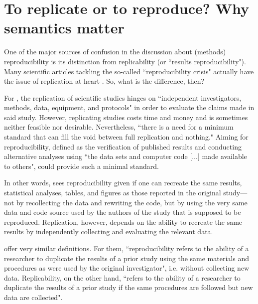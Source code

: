 \documentclass[11pt, a4paper,twoside]{report}\usepackage[]{graphicx}\usepackage[]{color}
\begin{document}
\section[To replicate or to reproduce?]{To replicate or to reproduce? Why semantics matter}
\label{sec:replicate}
One of the major sources of confusion in the discussion about (methods) reproducibility is its distinction from replicability (or ``results reproducibility"). Many scientific articles tackling the so-called ``reproducibility crisis" \citep{casadevall_reproducible_2010,prinz_believe_2011,begley2012drug,begley_six_2013,begley2015reproducibility,freedman_economics_2015,aarts2015estimating,baker2016there,baker2016reproducibility,crotty_reproducible_2017,nosek_reproducibility_2017} actually have the issue of replication at heart \citep{schooler2014metascience,stroebe_alleged_2014,kullmann2015biomedicine,maxwell_is_2015,earp_replication_2015,camerer_evaluating_2016,loken_measurement_2017}. So, what is the difference, then?

For \cite{peng_reproducible_2009}, the replication of scientific studies hinges on ``independent investigators, methods, data, equipment, and protocols" in order to evaluate the claims made in said study. However, replicating studies costs time and money and is sometimes neither feasible nor desirable. Nevertheless, ``there is a need for a minimum standard that can fill the void between full replication and nothing." Aiming for reproducibility, defined as the verification of published results and conducting alternative analyses using ``the data sets and computer code [$\dots$] made available to others", could provide such a minimal standard. 

In other words, \cite{peng_reproducible_2009} sees reproducibility given if one can recreate the same results, statistical analyses, tables, and figures as those reported in the original study---not by recollecting the data and rewriting the code, but by using the very same data and code source used by the authors of the study that is supposed to be reproduced. Replication, however, depends on the ability to recreate the same results by independently collecting and evaluating the relevant data.

\cite{cacioppo_social_2015} offer very similar definitions. For them, ``reproducibility refers to the ability of a researcher to duplicate the results of a prior study using the same materials and procedures as were used by the original investigator", i.e. without collecting new data. Replicability, on the other hand, ``refers to the ability of a researcher to duplicate the results of a prior study if the same procedures are followed but new data are collected".
\end{document}
